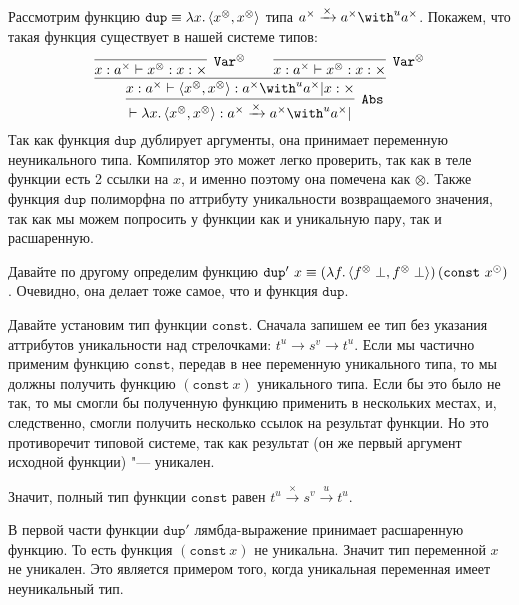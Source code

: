 \begin{example}
	Рассмотрим функцию $\mathtt{dup} \equiv \lambda x.\left<x^\otimes, x^\otimes\right>$ типа $a^\times \xrightarrow{\times} a^\times \with^u a^\times$.
	Покажем, что такая функция существует в нашей системе типов:
	\[
		\infer[\ruleAbs]
			{\vdash \lambda x.\pair{x^\otimes, x^\otimes} :a^\times \xrightarrow{\times} a^\times \with^u a^\times |}
			{
				\infer[]
					{x : a^\times \vdash \pair{x^\otimes, x^\otimes} : a^\times \with^u a^\times | x : \times}
					{
						\infer[\ruleVarS]{x : a^\times \vdash x^\otimes : x : \times}{} \qquad
						\infer[\ruleVarS]{x : a^\times \vdash x^\otimes : x : \times}{} 	
					}
			}
	\]
	Так как функция $\mathtt{dup}$ дублирует аргументы, она принимает переменную неуникального типа.
	Компилятор это может легко проверить, так как в теле функции есть 2 ссылки на $x$,
	и именно поэтому она помечена как $\otimes$.
	Также функция $\mathtt{dup}$ полиморфна по аттрибуту уникальности возвращаемого значения,
	так как мы можем попросить у функции как и уникальную пару, так и расшаренную.
\end{example}
\begin{example}
	Давайте по другому определим функцию
	$\mathtt{dup'}~x \equiv \left(\lambda f. \left<f^\otimes \perp, f^\otimes \perp\right> \right) \left(\mathtt{const}~x^\odot \right)$.
	Очевидно, она делает тоже самое, что и функция $\mathtt{dup}$.
	
	Давайте установим тип функции $\mathtt{const}$.
	Сначала запишем ее тип без указания аттрибутов уникальности над стрелочками: $t^u \to s^v \to t^u$.
	Если мы частично применим функцию $\mathtt{const}$, передав в нее переменную уникального типа,
	то мы должны получить функцию $(\mathtt{const}~x)$ уникального типа.
	Если бы это было не так, то мы смогли бы полученную функцию применить в нескольких местах, и,
	следственно, смогли получить несколько ссылок на результат функции.
	Но это противоречит типовой системе, так как результат (он же первый аргумент исходной функции) "--- уникален.

	Значит, полный тип функции $\mathtt{const}$ равен $t^u \xrightarrow{\times} s^v \xrightarrow{u} t^u$.

	В первой части функции $\mathtt{dup'}$ лямбда-выражение принимает расшаренную функцию.
	То есть функция $(\mathtt{const}~x)$ не уникальна. Значит тип переменной $x$ не уникален.
	Это является примером того, когда уникальная переменная имеет неуникальный тип.
\end{example}
